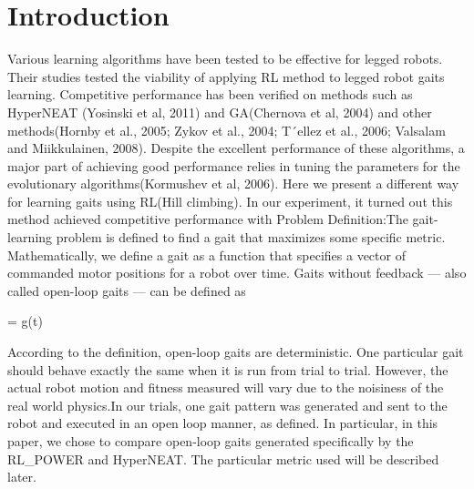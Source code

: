 \section{Introduction}


Various learning algorithms have been tested to be effective for
legged robots. Their studies tested the viability of applying RL
method to legged robot gaits learning. Competitive performance has
been verified on methods such as HyperNEAT (Yosinski et al, 2011) and
GA(Chernova et al, 2004) and other methods(Hornby et al., 2005; Zykov
et al., 2004; T´ellez et al., 2006; Valsalam and Miikkulainen,
2008). Despite the excellent performance of these algorithms, a major
part of achieving good performance relies in tuning the parameters for
the evolutionary algorithms(Kormushev et al, 2006). Here we present a
different way for learning gaits using RL(Hill climbing). In our
experiment, it turned out this method achieved competitive performance
with Problem Definition:The gait-learning problem is defined to find a
gait that maximizes some specific metric. Mathematically, we define a
gait as a function that specifies a vector of commanded motor
positions for a robot over time. Gaits without feedback --- also
called open-loop gaits --- can be defined as

\be{} = g(t)\ee

According to the definition, open-loop gaits are deterministic. One
particular gait should behave exactly the same when it is run from
trial to trial. However, the actual robot motion and fitness measured
will vary due to the noisiness of the real world physics.In our
trials, one gait pattern was generated and sent to the robot and
executed in an open loop manner, as defined. In particular, in this
paper, we chose to compare open-loop gaits generated specifically by
the RL\_POWER and HyperNEAT. The particular metric used will be
described later.
